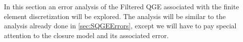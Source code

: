 In this section an error analysis of the Filtered QGE associated with the finite element
discretization will be explored. The analysis will be similar to the analysis already done in
\autoref{sec:SQGEErrors}, except we will have to pay special attention to the closure model and its
associated error.
